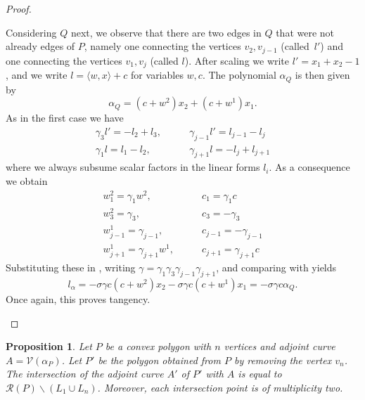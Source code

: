 \documentclass[a4paper,10pt]{amsart}
\theoremstyle{definition}
\theoremstyle{plain}
\newtheorem{prop}[Def]{Proposition}
\newcommand{\cR}{{\mathcal R}}
\newcommand{\cV}{{\mathcal V}}
\begin{document}
\begin{proof}
\begin{enumerate}
    Considering $Q$ next, we observe that there are two edges in $Q$ that were not already edges of $P$, namely one connecting the vertices $v_2, v_{j-1}$ (called~$l'$) and one connecting the vertices $v_1,v_j$ (called $l$). After scaling we write $l' = x_1+x_2 - 1$, and we write $l = \langle w, x \rangle + c$ for variables $w, c$. The polynomial $\alpha_{Q}$ is then given by
    \begin{equation} \label{eq:case2_tRed}
        \alpha_{Q} = (c + w^2) x_2 + (c + w^1) x_1.
    \end{equation}    
    As in the first case we have
    \begin{align*}
        \gamma_3 l' = - l_2 + l_3, &\qquad \gamma_{j-1} l' = l_{j-1} - l_j \\
        \gamma_1 l = l_1 - l_2, &\qquad \gamma_{j+1} l = -l_j + l_{j+1}
    \end{align*}
    where we always subsume scalar factors in the linear forms $l_i$. As a consequence we obtain
    \begin{equation*}
    \begin{split}
        w_1^2 = \gamma_1w^2, &\qquad c_1 = \gamma_1 c \\
        w_3^2 = \gamma_3, &\qquad c_3 = -\gamma_3 \\
        w_{j-1}^1 = \gamma_{j-1}, &\qquad c_{j-1} = -\gamma_{j-1} \\
        w_{j+1}^1 = \gamma_{j+1}w^1, &\qquad c_{j+1} = \gamma_{j+1} c
    \end{split}
    \end{equation*}
    Substituting these in , writing $\gamma = \gamma_1\gamma_3\gamma_{j-1}\gamma_{j+1}$, and comparing with  yields
    \begin{equation*}
        l_\alpha = - \sigma \gamma c (c + w^2)x_2 - \sigma \gamma c (c + w^1)x_1 = - \sigma \gamma c \alpha_{Q}.
    \end{equation*}
    Once again, this proves tangency.\qedhere
    \end{enumerate}
\end{proof}



\begin{prop}\label{thm:adjointcontact}
    Let $P$ be a convex polygon with $n$ vertices and adjoint curve $A = \cV(\alpha_P)$. Let $P'$ be the polygon obtained from $P$ by removing the vertex $v_n$. The intersection of the adjoint curve $A'$ of $P'$ with $A$ is equal to $\cR(P) \smallsetminus (L_1 \cup L_n)$. Moreover, each intersection point is of multiplicity two.
\end{prop}
\end{document}
